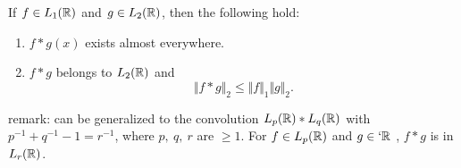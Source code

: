 

\begin{frame}
\begin{theorem}
If $f\in L_1(\mathbb{R})$ and $g\in L_2(\mathbb{R})$, then the following hold:
\begin{enumerate}[label=(\roman*)]
\item $f*g(x)$ exists almost everywhere.
\item $f*g$ belongs to  $L_2(\mathbb{R})$ and
$$
\Vert f*g\Vert_{2}\leq\Vert f\Vert_{1}\Vert g\Vert_{2} .
$$
\end{enumerate}
\end{theorem}
\alert{remark:}  can be generalized to the convolution $L_{p}(\mathbb{R})*L_{q}(\mathbb{R})$ with $p^{-1}+q^{-1}-1=r^{-1}$, where $p,\ q,\ r$ are $\geq 1$. For $f\in L_{p}(\mathbb{R})$ and $ g\in \lq{\rset}$ , $f*g$ is in $L_{r}(\mathbb{R})$.
\end{frame}

